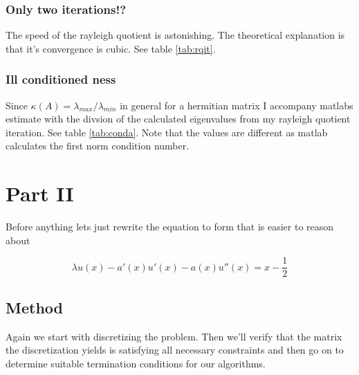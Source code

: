 \documentclass[a4paper,11pt]{article}
\begin{document}
\subsubsection{Only two iterations!?}

The speed of the rayleigh quotient is astonishing. The theoretical
explanation is that it's convergence is cubic. See table
\ref{tab:rqit}.

\subsubsection{Ill conditioned ness}

Since $\kappa(A) = \lambda_{max}/\lambda_{min}$ in general for a
hermitian matrix I accompany matlabs estimate with the divsion of the
calculated eigenvalues from my rayleigh quotient iteration. See table
\ref{tab:conda}. Note that the values are different as matlab calculates
the first norm condition number.



\section{Part II}

Before anything lets just rewrite the equation to form that is easier to
reason about

\[
  \lambda u(x) - a'(x)u'(x) - a(x)u''(x) = x - \frac{1}{2}
\]

\subsection{Method}

Again we start with discretizing the problem. Then we'll verify that the matrix
the discretization yields is satisfying all necessary constraints and then go
on to determine suitable termination conditions for our algorithms.
\end{document}
